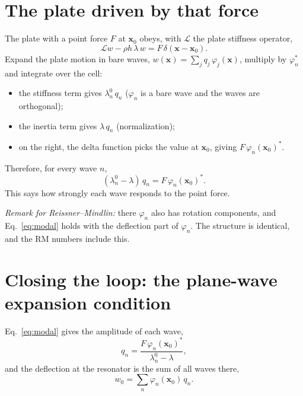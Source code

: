 \section{The plate driven by that force}

The plate with a point force $F$ at $\mathbf{x}_0$ obeys, with $\mathcal{L}$ the
plate stiffness operator,
\begin{equation}
  \mathcal{L} w - \rho h\,\lambda\, w = F\,\delta(\mathbf{x} - \mathbf{x}_0) .
\end{equation}
Expand the plate motion in bare waves, $w(\mathbf{x}) = \sum_j q_j\,\varphi_j(\mathbf{x})$,
multiply by $\varphi_n^*$ and integrate over the cell:
\begin{itemize}
  \item the stiffness term gives $\lambda_n^0\, q_n$ ($\varphi_n$ is a bare wave
        and the waves are orthogonal);
  \item the inertia term gives $\lambda\, q_n$ (normalization);
  \item on the right, the delta function picks the value at $\mathbf{x}_0$,
        giving $F\,\varphi_n(\mathbf{x}_0)^*$.
\end{itemize}
Therefore, for every wave $n$,
\begin{equation}
  (\lambda_n^0 - \lambda)\, q_n = F\,\varphi_n(\mathbf{x}_0)^* .
  \label{eq:modal}
\end{equation}
This says how strongly each wave responds to the point force.

\emph{Remark for Reissner--Mindlin:} there $\varphi_n$ also has rotation
components, and Eq.~\eqref{eq:modal} holds with the deflection part of
$\varphi_n$. The structure is identical, and the RM numbers include this.

\section{Closing the loop: the plane-wave expansion condition}

Eq.~\eqref{eq:modal} gives the amplitude of each wave,
\begin{equation}
  q_n = \frac{F\,\varphi_n(\mathbf{x}_0)^*}{\lambda_n^0 - \lambda} ,
  \label{eq:qn}
\end{equation}
and the deflection at the resonator is the sum of all waves there,
\begin{equation}
  w_0 = \sum_n \varphi_n(\mathbf{x}_0)\, q_n .
  \label{eq:w0_sum}
\end{equation}

